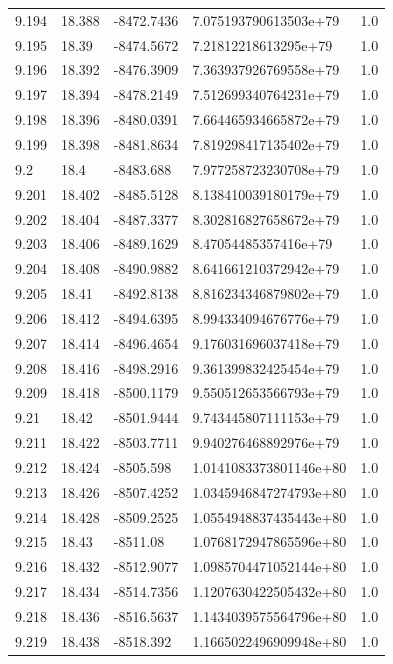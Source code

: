 \begin{tabular}{lllll}
9.194 & 18.388 & -8472.7436 & 7.075193790613503e+79 & 1.0 \\
9.195 & 18.39 & -8474.5672 & 7.21812218613295e+79 & 1.0 \\
9.196 & 18.392 & -8476.3909 & 7.363937926769558e+79 & 1.0 \\
9.197 & 18.394 & -8478.2149 & 7.512699340764231e+79 & 1.0 \\
9.198 & 18.396 & -8480.0391 & 7.664465934665872e+79 & 1.0 \\
9.199 & 18.398 & -8481.8634 & 7.819298417135402e+79 & 1.0 \\
9.2 & 18.4 & -8483.688 & 7.977258723230708e+79 & 1.0 \\
9.201 & 18.402 & -8485.5128 & 8.138410039180179e+79 & 1.0 \\
9.202 & 18.404 & -8487.3377 & 8.302816827658672e+79 & 1.0 \\
9.203 & 18.406 & -8489.1629 & 8.47054485357416e+79 & 1.0 \\
9.204 & 18.408 & -8490.9882 & 8.641661210372942e+79 & 1.0 \\
9.205 & 18.41 & -8492.8138 & 8.816234346879802e+79 & 1.0 \\
9.206 & 18.412 & -8494.6395 & 8.994334094676776e+79 & 1.0 \\
9.207 & 18.414 & -8496.4654 & 9.176031696037418e+79 & 1.0 \\
9.208 & 18.416 & -8498.2916 & 9.361399832425454e+79 & 1.0 \\
9.209 & 18.418 & -8500.1179 & 9.550512653566793e+79 & 1.0 \\
9.21 & 18.42 & -8501.9444 & 9.743445807111153e+79 & 1.0 \\
9.211 & 18.422 & -8503.7711 & 9.940276468892976e+79 & 1.0 \\
9.212 & 18.424 & -8505.598 & 1.0141083373801146e+80 & 1.0 \\
9.213 & 18.426 & -8507.4252 & 1.0345946847274793e+80 & 1.0 \\
9.214 & 18.428 & -8509.2525 & 1.0554948837435443e+80 & 1.0 \\
9.215 & 18.43 & -8511.08 & 1.0768172947865596e+80 & 1.0 \\
9.216 & 18.432 & -8512.9077 & 1.0985704471052144e+80 & 1.0 \\
9.217 & 18.434 & -8514.7356 & 1.1207630422505432e+80 & 1.0 \\
9.218 & 18.436 & -8516.5637 & 1.1434039575564796e+80 & 1.0 \\
9.219 & 18.438 & -8518.392 & 1.1665022496909948e+80 & 1.0 \\

\end{tabular}
